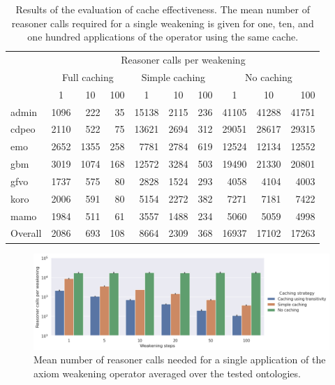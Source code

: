\begin{table}[ht]
  \scriptsize
  \centering
  \begin{tabular}{|l|rrr|rrr|rrr|}
    \hline
    & \multicolumn{9}{c|}{\hspace{-4mm}Reasoner calls per weakening} \\
    & \multicolumn{3}{c}{Full caching} & \multicolumn{3}{c}{Simple caching} & \multicolumn{3}{c|}{No caching} \\
    & \multicolumn{1}{c}{1} & \multicolumn{1}{c}{10} & \multicolumn{1}{c}{100} & \multicolumn{1}{c}{1} & \multicolumn{1}{c}{10} & \multicolumn{1}{c}{100} & \multicolumn{1}{c}{1} & \multicolumn{1}{c}{10} & 100 \\
    \hline
    admin & 1096 & 222 & 35
      & 15138 & 2115 & 236
      & 41105 & 41288 & 41751 \\
    cdpeo & 2110 & 522 & 75
      & 13621 & 2694 & 312
      & 29051 & 28617 & 29315 \\
    emo & 2652 & 1355 & 258
      & 7781 & 2784 & 619
      & 12524 & 12134 & 12552 \\
    gbm & 3019 & 1074 & 168
      & 12572 & 3284 & 503
      & 19490 & 21330 & 20801 \\
    gfvo & 1737 & 575 & 80
      & 2828 & 1524 & 293
      & 4058 & 4104 & 4003 \\
    koro & 2006 & 591 & 80
      & 5154 & 2272 & 382
      & 7271 & 7181 & 7422 \\
    mamo &  1984 & 511 & 61
      & 3557 & 1488 & 234
      & 5060 & 5059 & 4998 \\
    \hline
    Overall & 2086 & 693 & 108
      & 8664 & 2309 & 368
      & 16937 & 17102 & 17263 \\
    \hline
  \end{tabular}
  \caption{Results of the evaluation of cache effectiveness. The mean number of reasoner calls required for a single weakening is given for one, ten, and one hundred applications of the operator using the same cache.}
  \label{table:results-cache-calls}
\end{table}

\begin{figure}[ht]
  \centering
  \includegraphics[width=\textwidth]{resources/calls-cache-bar.png}
  \caption{Mean number of reasoner calls needed for a single application of the axiom weakening operator averaged over the tested ontologies.}
  \label{fig:results-cache-calls}
\end{figure}

